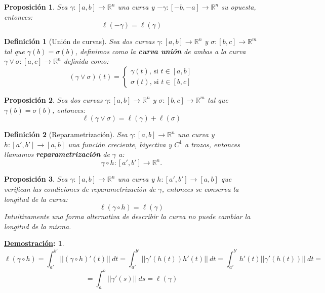 \documentclass[10pt,a4paper,openright]{book}
\theoremstyle{break}
\newtheorem*{defi}{Definición}
\newtheorem*{prop}{Proposición}
\newtheorem*{demo}{\underline{Demostración}:}
\newcommand{\dif}[1]{\ d#1}
\begin{document}
\begin{prop}
Sea $\gamma:[a,b]\rightarrow \mathbb{R}^n$ una curva y $-\gamma:[-b,-a]\rightarrow \mathbb{R}^n$ su opuesta, entonces: 
$$\ell \left( -\gamma \right) = \ell \left( \gamma \right) $$
\end{prop}

\begin{defi}[Unión de curvas]
Sea dos curvas $\gamma : \left[ a, b \right] \rightarrow \mathbb{R}^n$ y $\sigma : \left[ b, c \right] \rightarrow \mathbb{R}^m$ tal que $\gamma\left( b \right) = \sigma \left( b \right)$, definimos como la \textbf{curva unión} de ambas a la curva $\gamma \lor \sigma: \left[ a, c \right] \rightarrow \mathbb{R}^n$ definida como:
$$\left( \gamma \lor \sigma \right) \left( t \right) = \begin{cases}
    \gamma\left( t \right) \text{, si } t \in \left[ a, b \right]\\
    \sigma\left( t \right) \text{, si } t \in \left[ b, c \right] 
\end{cases}$$
\end{defi}
\begin{prop}
Sea dos curvas $\gamma : \left[ a, b \right] \rightarrow \mathbb{R}^n$ y $\sigma : \left[ b, c \right] \rightarrow \mathbb{R}^m$ tal que $\gamma\left( b \right) = \sigma \left( b \right)$, entonces:
$$\ell \left( \gamma \lor \sigma \right) = \ell \left( \gamma \right) + \ell\left( \sigma \right) $$
\end{prop}

\begin{defi}[Reparametrización]
Sea $\gamma: \left[ a, b \right] \rightarrow \mathbb{R}^n$ una curva y $h: \left[ a', b' \right] \rightarrow \left[ a, b \right]$ una función creciente, biyectiva y $C^1$ a trozos, entonces llamamos \textbf{reparametrización} de $\gamma$ a:
$$\gamma \circ h: \left[ a', b' \right] \rightarrow \mathbb{R}^n.$$
\end{defi}

\begin{prop}
Sea $\gamma: \left[ a, b \right] \rightarrow \mathbb{R}^n$ una curva y $h: \left[ a', b' \right] \rightarrow \left[ a, b \right]$ que verifican las condiciones de reparametrización de $\gamma$, entonces se conserva la longitud de la curva: 
$$\ell \left( \gamma \circ h \right) = \ell \left( \gamma \right) $$
Intuitivamente una forma alternativa de describir la curva no puede cambiar la longitud de la misma.
\end{prop}
\begin{demo}
$$\ell \left( \gamma \circ h\right) = \int_{a'}^{b'} \lvert \lvert \left( \gamma \circ h \right)'\left( t \right) \rvert \rvert \dif{t} =  \int_{a'}^{b'} \lvert \lvert \gamma'\left( h\left( t \right) \right) h'\left( t \right) \rvert \rvert \dif{t} = \int_{a'}^{b'} h'\left( t \right) \lvert \lvert \gamma'\left( h\left( t \right) \right) \rvert \rvert \dif{t} = $$
$$= \int_{a}^{b} \lvert \lvert \gamma'\left( s \right) \rvert \rvert \dif{s} = \ell \left( \gamma \right) $$    
\end{demo}
\end{document}
